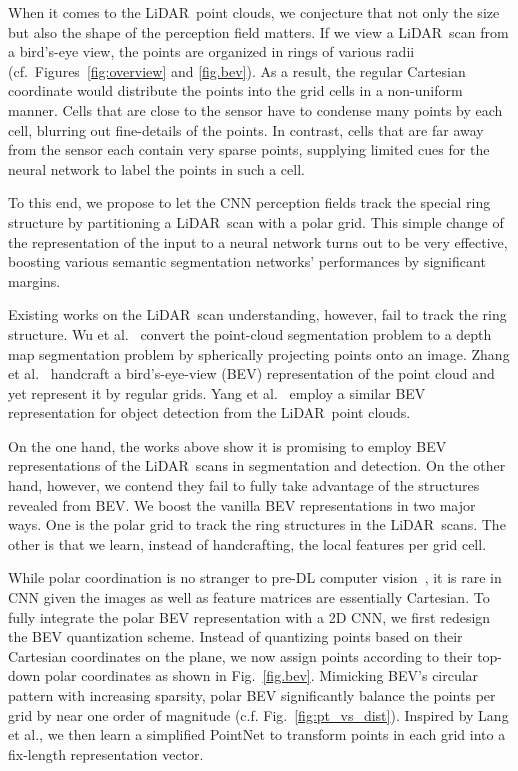 \documentclass[10pt,twocolumn,letterpaper]{article}
\newcommand{\lidar}{\mbox{LiDAR }}
\begin{document}
When it comes to the \lidar point clouds, we conjecture that not only the size but also the shape of the perception field matters. If we view a \lidar scan from a bird's-eye view, the points are organized in rings of various radii (cf.\ Figures~\ref{fig:overview} and  \ref{fig.bev}). As a result, the regular Cartesian coordinate would distribute the points into the grid cells in a non-uniform manner. Cells that are close to the sensor have to condense many points by each cell, blurring out fine-details of the points. In contrast, cells that are far away from the sensor each contain very sparse points, supplying limited cues for the neural network to label the points in such a cell. 

To this end, we propose to let the CNN perception fields track the special ring structure by partitioning a \lidar scan with a polar grid.  This simple change of the representation of the input to a neural network turns out to be very effective, boosting various semantic segmentation networks' performances by significant margins. 

Existing works on the \lidar scan understanding, however, fail to track the ring structure. Wu et al.~\cite{wu2019squeezesegv2} convert the point-cloud segmentation problem to a depth map segmentation problem by spherically projecting points onto an image. Zhang et al.~\cite{zhang2018efficient} handcraft a bird's-eye-view (BEV) representation of the point cloud and yet represent it by regular grids. Yang et al.~\cite{yang2018pixor} employ a similar BEV representation for object detection from the \lidar point clouds. 

On the one hand, the works above show it is promising to employ BEV representations of the \lidar scans in segmentation and detection. On the other hand, however, we contend they fail to fully take advantage of the structures revealed from BEV. We boost the vanilla BEV representations in two major ways. One is the polar grid to track the ring structures in the \lidar scans. The other is that we learn, instead of handcrafting, the local features per grid cell.

While polar coordination is no stranger to pre-DL computer vision~\cite{belongie2001shape}, it is rare in CNN given the images as well as feature matrices are essentially Cartesian. To fully integrate the polar BEV representation with a 2D CNN, we first redesign the BEV quantization scheme. Instead of quantizing points based on their Cartesian coordinates on the  plane, we now assign points according to their top-down polar coordinates as shown in Fig.~\ref{fig.bev}. Mimicking BEV's circular pattern with increasing sparsity, polar BEV significantly balance the points per grid by near one order of magnitude (c.f. Fig.~\ref{fig:pt_vs_dist}). Inspired by Lang et al.\cite{lang2019pointpillars}, we then learn a simplified PointNet to transform points in each grid into a fix-length representation vector. 
\end{document}
